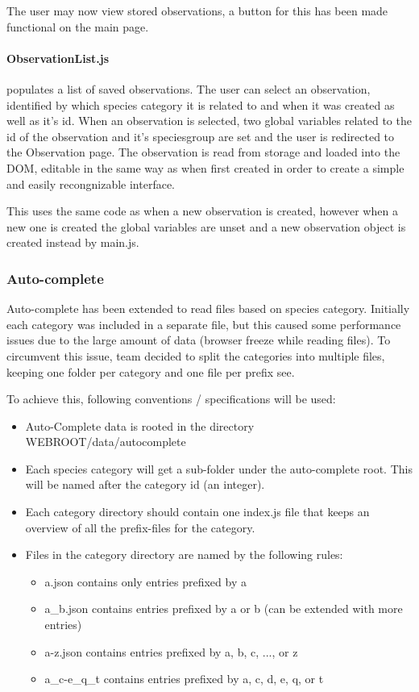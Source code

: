 The user may now view stored observations, a button for this has been made functional on the main page.
\paragraph{ObservationList.js} populates a list of saved observations.
The user can select an observation, identified by which species category it is related to and when it was created as well as it's id.
When an observation is selected, two global variables related to the id of the observation and it's speciesgroup are set and the user is redirected to the Observation page.
The observation is read from storage and loaded into the DOM, editable in the same way as when first created in order to create a simple and easily recongnizable interface.

This uses the same code as when a new observation is created, however when a new one is created the global variables are unset and a new observation object is created instead by main.js.

	\subsubsection{Auto-complete}

	Auto-complete has been extended to read files based on species category.
	Initially each category was included in a separate file, but this caused some
	performance issues due to the large amount of data (browser freeze while reading
	files). To circumvent this issue, team decided to split the categories into
	multiple files, keeping one folder per category and one file per prefix see.

	To achieve this, following conventions / specifications will be used:

	\begin{itemize}
		\item Auto-Complete data is rooted in the directory WEBROOT/data/autocomplete
		\item Each species category will get a sub-folder under the auto-complete
		root. This will be named after the category id (an integer).
		\item Each category directory should contain one index.js file that
		keeps an overview of all the prefix-files for the category.
		\item Files in the category directory are named by the following rules:
			\begin{itemize}
				\item a.json contains only entries prefixed by a
				\item a\_b.json contains entries prefixed by a or b (can be
				extended with more entries)
				\item a-z.json contains entries prefixed by a, b, c, ..., or z
				\item a\_c-e\_q\_t contains entries prefixed by a, c, d, e, q, or t
			\end{itemize}
	\end{itemize}

